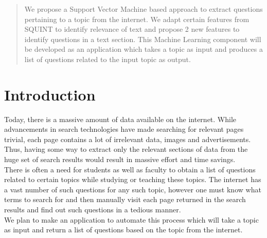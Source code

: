 \documentclass[10pt,a4paper]{report}
\begin{document}

\vspace{2in}

\begin{abstract} 
We propose a Support Vector Machine based approach to extract questions pertaining to a topic from the internet. We adapt certain features from SQUINT\cite{squint} to identify relevance of text and propose 2 new features to identify questions in a text section. This Machine Learning component will be developed as an application which takes a topic as input and produces a list of questions related to the input topic as output.
\end{abstract}


\tableofcontents

\newpage
{} %


\chapter{Introduction}

Today, there is a massive amount of data available on the internet. While advancements in search technologies have made searching for relevant pages trivial, each page contains a lot of irrelevant data, images and advertisements. Thus, having some way to extract only the relevant sections of data from the huge set of search results would result in massive effort and time savings. \\

There is often a need for students as well as faculty to obtain a list of questions related to certain topics while studying or teaching these topics. The internet has a vast number of such questions for any such topic, however one must know what terms to search for and then manually visit each page returned in the search results and find out such questions in a tedious manner. \\

We plan to make an application to automate this process which will take a topic as input and return a list of questions based on the topic from the internet.
\end{document}
